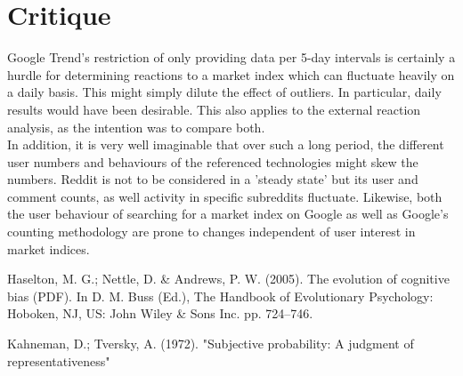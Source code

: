 \documentclass[12pt]{article}
\begin{document}
\section{Critique}
Google Trend's restriction of only providing data per 5-day intervals is certainly a hurdle for determining reactions to a market index which can fluctuate heavily on a daily basis. This might simply dilute the effect of outliers. In particular, daily results would have been desirable. This also applies to the external reaction analysis, as the intention was to compare both. \\
In addition, it is very well imaginable that over such a long period, the different user numbers and behaviours of the referenced technologies might skew the numbers. Reddit is not to be considered in a 'steady state' but its user and comment counts, as well activity in specific subreddits fluctuate. Likewise, both the user behaviour of searching for a market index on Google as well as Google's counting methodology are prone to changes independent of user interest in market indices. 
\newpage
\begin{thebibliography}{9}

Haselton, M. G.; Nettle, D. \& Andrews, P. W. (2005). The evolution of cognitive bias (PDF). In D. M. Buss (Ed.), The Handbook of Evolutionary Psychology: Hoboken, NJ, US: John Wiley \& Sons Inc. pp. 724–746.
 
 Kahneman, D.; Tversky, A. (1972). "Subjective probability: A judgment of representativeness"
\end{thebibliography}
\end{document}

